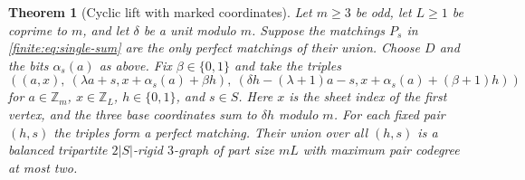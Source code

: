 \documentclass[10pt]{article}
\numberwithin{equation}{section}
\newtheorem{theorem}{Theorem}[section]
\begin{document}
\begin{theorem}[Cyclic lift with marked coordinates]\label{finite:thm:signature-lift}
Let $m\ge3$ be odd, let $L\ge1$ be coprime to $m$, and let $\delta$
be a unit modulo $m$. Suppose the matchings $P_s$ in
\cref{finite:eq:single-sum} are the only perfect matchings of their union.
Choose $D$ and the bits $\alpha_s(a)$ as above. Fix $\beta\in\{0,1\}$ and take the triples
\begin{equation}\label{finite:eq:signature-lift}
 \left((a,x),\ (\lambda a+s,x+\alpha_s(a)+\beta h),\
 (\delta h-(\lambda+1)a-s,x+\alpha_s(a)+(\beta+1)h)\right)
\end{equation}
for $a\in\mathbb Z_m$, $x\in\mathbb Z_L$, $h\in\{0,1\}$, and
$s\in S$. Here $x$ is the sheet index of the first vertex, and the three base coordinates sum to $\delta h$ modulo $m$. For each fixed pair $(h,s)$ the triples form a perfect matching. Their union over all $(h,s)$ is a balanced tripartite $2|S|$-rigid
$3$-graph of part size $mL$ with maximum pair codegree at most two.
\end{theorem}
\end{document}
